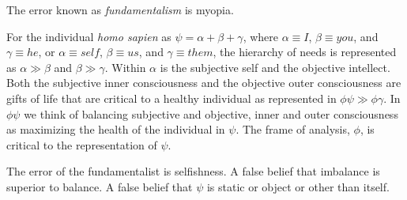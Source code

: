 

The error known as {\it fundamentalism} is myopia.  

For the individual {\it homo sapien} as $\psi = \alpha + \beta
+ \gamma$, where $\alpha \equiv I$, $\beta \equiv you$, and
$\gamma \equiv he$, or $\alpha \equiv self$, $\beta \equiv us$, and
$\gamma \equiv them$, the hierarchy of needs is represented as
$\alpha \gg \beta$ and $\beta \gg \gamma$.  Within $\alpha$ is the
subjective self and the objective intellect.  Both the subjective
inner consciousness and the objective outer consciousness are gifts of
life that are critical to a healthy individual as represented in
$\phi\psi \gg \phi\gamma$.  In $\phi\psi$ we think of balancing
subjective and objective, inner and outer consciousness as maximizing
the health of the individual in $\psi$.  The frame of analysis,
$\phi$, is critical to the representation of $\psi$.

The error of the fundamentalist is selfishness.  A false belief that
imbalance is superior to balance.  A false belief that $\psi$ is
static or object or other than itself.  

\bye
